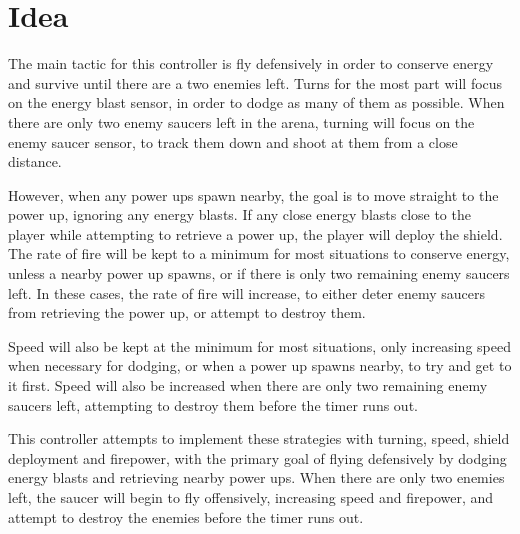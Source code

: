 \section{Idea}

The main tactic for this controller is fly defensively in order to conserve energy and survive until there are a two enemies left. Turns for the most part will focus on the energy blast sensor, in order to dodge as many of them as possible. When there are only two enemy saucers left in the arena, turning will focus on the enemy saucer sensor, to track them down and shoot at them from a close distance.

However, when any power ups spawn nearby, the goal is to move straight to the power up, ignoring any energy blasts. If any close energy blasts close to the player while attempting to retrieve a power up, the player will deploy the shield. The rate of fire will be kept to a minimum for most situations to conserve energy, unless a nearby power up spawns, or if there is only two remaining enemy saucers left. In these cases, the rate of fire will increase, to either deter enemy saucers from retrieving the power up, or attempt to destroy them.

Speed will also be kept at the minimum for most situations, only increasing speed when necessary for dodging, or when a power up spawns nearby, to try and get to it first. Speed will also be increased when there are only two remaining enemy saucers left, attempting to destroy them before the timer runs out.

This controller attempts to implement these strategies with turning, speed, shield deployment and firepower, with the primary goal of flying defensively by dodging energy blasts and retrieving nearby power ups. When there are only two enemies left, the saucer will begin to fly offensively, increasing speed and firepower, and attempt to destroy the enemies before the timer runs out.